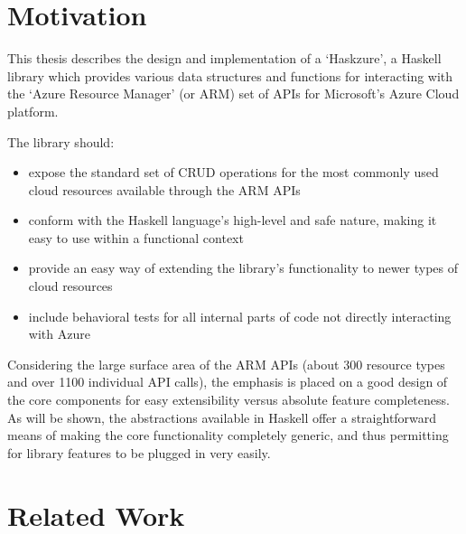 \documentclass[11pt]{report}
\begin{document}
\section{Motivation}

This thesis describes the design and implementation of a `Haskzure', a Haskell
library which provides various data structures and functions for interacting
with the `Azure Resource Manager' (or ARM) set of APIs for Microsoft's Azure
Cloud platform. \newline

The library should:
\begin{itemize}
    \item{} expose the standard set of CRUD operations for the most commonly
        used cloud resources available through the ARM APIs
    \item{} conform with the Haskell language's high-level and safe nature,
        making it easy to use within a functional context
    \item{} provide an easy way of extending the library's functionality to
        newer types of cloud resources
    \item{} include behavioral tests for all internal parts of code not
        directly interacting with Azure
\end{itemize}
Considering the large surface area of the ARM APIs (about 300 resource
types and over 1100 individual API calls), the emphasis is placed on a
good design of the core components for easy extensibility versus absolute
feature completeness. As will be shown, the abstractions available in Haskell
offer a straightforward means of making the core functionality completely
generic, and thus permitting for library features to be plugged in very easily.


\section{Related Work}
\end{document}
